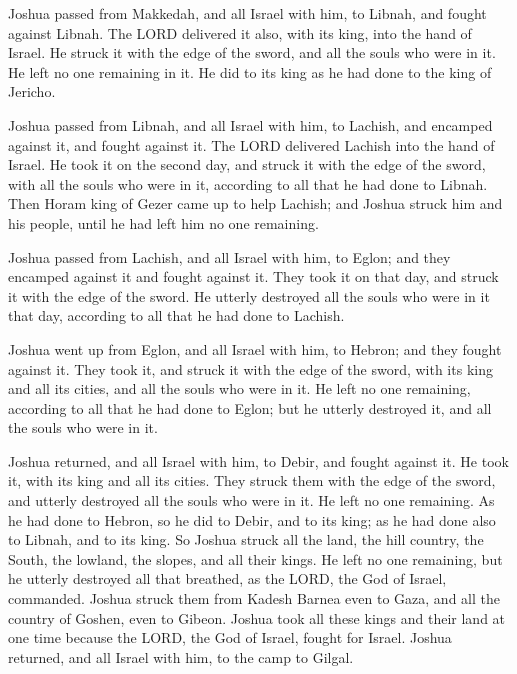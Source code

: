  Joshua passed from Makkedah, and all Israel with him, to
Libnah, and fought against Libnah.  The LORD delivered it
also, with its king, into the hand of Israel. He struck it with the edge
of the sword, and all the souls who were in it. He left no one remaining
in it. He did to its king as he had done to the king of Jericho.

 Joshua passed from Libnah, and all Israel with him, to
Lachish, and encamped against it, and fought against it. 
The LORD delivered Lachish into the hand of Israel. He took it on the
second day, and struck it with the edge of the sword, with all the souls
who were in it, according to all that he had done to Libnah.
 Then Horam king of Gezer came up to help Lachish; and
Joshua struck him and his people, until he had left him no one
remaining.

 Joshua passed from Lachish, and all Israel with him, to
Eglon; and they encamped against it and fought against it.
 They took it on that day, and struck it with the edge of
the sword. He utterly destroyed all the souls who were in it that day,
according to all that he had done to Lachish.

 Joshua went up from Eglon, and all Israel with him, to
Hebron; and they fought against it.  They took it, and
struck it with the edge of the sword, with its king and all its cities,
and all the souls who were in it. He left no one remaining, according to
all that he had done to Eglon; but he utterly destroyed it, and all the
souls who were in it.

 Joshua returned, and all Israel with him, to Debir, and
fought against it.  He took it, with its king and all its
cities. They struck them with the edge of the sword, and utterly
destroyed all the souls who were in it. He left no one remaining. As he
had done to Hebron, so he did to Debir, and to its king; as he had done
also to Libnah, and to its king.  So Joshua struck all
the land, the hill country, the South, the lowland, the slopes, and all
their kings. He left no one remaining, but he utterly destroyed all that
breathed, as the LORD, the God of Israel, commanded. 
Joshua struck them from Kadesh Barnea even to Gaza, and all the country
of Goshen, even to Gibeon.  Joshua took all these kings
and their land at one time because the LORD, the God of Israel, fought
for Israel.  Joshua returned, and all Israel with him, to
the camp to Gilgal.

